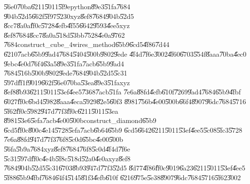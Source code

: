 \documentclass[12pt,a4paper]{article}
\begin{document}
\bigskip

\U{56e0}\U{70ba}\U{6211}\U{5011}\U{5f9e}python\U{89e3}\U{51fa}\U{7684}%
\U{904b}\U{52d5}\U{662f}\U{5f97}\U{5230}xyz\U{8ef8}\U{7684}\U{904b}\U{52d5}%
\U{8cc7}\U{8a0a}\U{ff0c}\U{5728}\U{4efb}\U{4f55}\U{6642}\U{9593}\U{4ee5}xyz%
\U{8ef8}\U{7684}\U{8cc7}\U{8a0a}\U{518d}\U{53bb}\U{7528}\U{4e0a}\U{9762}%
\U{7684}construct\_cube\_4wires\_method\U{65b9}\U{6cd5}\U{4f86}\U{7d44}%
\U{6210}\U{7acb}\U{65b9}\U{9ad4}\U{7684}\U{5404}\U{500b}\U{9802}\U{9ede}%
\U{4f4d}\U{7f6e}\U{3002}\U{4f60}\U{6703}\U{554f}\U{8aaa}\U{70ba}\U{4ec0}%
\U{9ebc}\U{4e0d}\U{76f4}\U{63a5}\U{89e3}\U{51fa}\U{7acb}\U{65b9}\U{9ad4}%
\U{7684}\U{516b}\U{500b}\U{9802}\U{9ede}\U{7684}\U{904b}\U{52d5}\U{5c31}%
\U{597d}\U{ff1f}\U{9019}\U{662f}\U{56e0}\U{70ba}\U{53ea}\U{89e3}\U{51fa}xyz%
\U{8ef8}\U{8b93}\U{6211}\U{5011}\U{53ef}\U{4ee5}\U{7368}\U{7acb}\U{51fa}%
\U{7e6a}\U{88fd}\U{4efb}\U{610f}\U{7269}\U{9ad4}\U{7684}\U{65b9}\U{4fbf}%
\U{6027}\U{ff0c}\U{6bd4}\U{5982}\U{8aaa}\U{4eca}\U{5929}\U{82e5}\U{60f3}%
\U{8981}\U{756b}\U{4e00}\U{500b}\U{66f4}\U{8907}\U{96dc}\U{7684}\U{5716}%
\U{5f62}\U{ff0c}\U{5982}\U{947d}\U{77f3}\U{ff0c}\U{6211}\U{5011}\U{53ea}%
\U{8981}\U{53e6}\U{5efa}\U{7acb}\U{4e00}\U{500b}construct\_diamond\U{65b9}%
\U{6cd5}\U{ff0c}\U{800c}\U{4e14}\U{5728}\U{5efa}\U{7acb}\U{6b64}\U{65b9}%
\U{6cd5}\U{6642}\U{6211}\U{5011}\U{53ef}\U{4ee5}\U{5c08}\U{5fc3}\U{5728}%
\U{7e6a}\U{88fd}\U{947d}\U{77f3}\U{76f8}\U{5c0d}\U{65bc}\U{4e00}\U{500b}%
\U{56fa}\U{5b9a}\U{7684}xyz\U{8ef8}\U{7684}\U{76f8}\U{5c0d}\U{4f4d}\U{7f6e}%
\U{5c31}\U{597d}\U{ff0c}\U{4e4b}\U{5f8c}\U{518d}\U{52a0}\U{4e0a}xyz\U{8ef8}%
\U{7684}\U{904b}\U{52d5}\U{5c31}\U{6703}\U{8b93}\U{947d}\U{77f3}\U{52d5}%
\U{8d77}\U{4f86}\U{ff0c}\U{9019}\U{6a23}\U{6211}\U{5011}\U{53ef}\U{4ee5}%
\U{5f88}\U{65b9}\U{4fbf}\U{7684}\U{64f4}\U{5145}\U{81f3}\U{4efb}\U{610f}%
\U{6216}\U{975e}\U{5e38}\U{8907}\U{96dc}\U{7684}\U{5716}\U{5f62}\U{3002}

\bigskip
\end{document}
